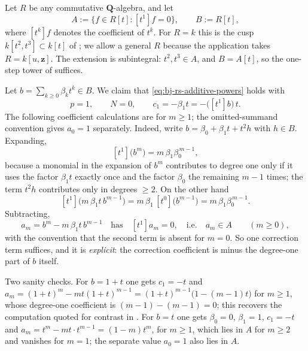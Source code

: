 \begin{example}[The cusp: $p=1$, with $c_1$ exhibited]
\label{ex:ch44-cusp-rs}
Let $R$ be any commutative $\mathbf Q$-algebra, and let
\[
 A:=\{f\in R[t]:[t^1]f=0\},
 \qquad
 B:=R[t],
\]
where $[t^k]f$ denotes the coefficient of $t^k$.  For $R=k$ this is
the cusp $k[t^2,t^3]\subset k[t]$ of ;
we allow a general $R$ because the application takes
$R=k[u,\mathbf z]$.  The extension is subintegral: $t^2,t^3\in A$, and
$B=A[t]$, so the one-step tower of  suffices.

Let $b=\sum_{k\ge0}\beta_kt^k\in B$.  We claim that
\eqref{eq:bj-rs-additive-powers} holds with
\[
 p=1,
 \qquad
 N=0,
 \qquad
 c_1=-\beta_1t=-\bigl([t^1]b\bigr)\,t.
\]
The following coefficient calculations are for $m\ge1$;
the omitted-summand convention gives $a_0=1$ separately.
Indeed, write $b=\beta_0+\beta_1t+t^2h$ with $h\in B$.  Expanding,
\[
 [t^1]\bigl(b^m\bigr)
 =m\,\beta_1\beta_0^{\,m-1},
\]
because a monomial in the expansion of $b^m$ contributes to degree one
only if it uses the factor $\beta_1t$ exactly once and the factor
$\beta_0$ the remaining $m-1$ times; the term $t^2h$ contributes only
in degrees $\ge2$.  On the other hand
\[
 [t^1]\bigl(m\,\beta_1t\,b^{m-1}\bigr)
 =m\,\beta_1\,[t^0]\bigl(b^{m-1}\bigr)
 =m\,\beta_1\beta_0^{\,m-1}.
\]
Subtracting,
\[
 a_m=b^m-m\,\beta_1t\,b^{m-1}
 \quad\text{has}\quad
 [t^1]a_m=0,
 \quad\text{i.e.}\quad
 a_m\in A
 \qquad(m\ge0),
\]
with the convention that the second term is absent for $m=0$.  So one
correction term suffices, and it is \emph{explicit}: the correction
coefficient is minus the degree-one part of $b$ itself.

Two sanity checks.  For $b=1+t$ one gets $c_1=-t$ and
$a_m=(1+t)^m-mt(1+t)^{m-1}=(1+t)^{m-1}\bigl(1-(m-1)t\bigr)$
for $m\ge1$, whose
degree-one coefficient is $(m-1)-(m-1)=0$; this recovers the computation
quoted for contrast in .  For
$b=t$ one gets $\beta_0=0$, $\beta_1=1$, $c_1=-t$ and
$a_m=t^m-mt\cdot t^{m-1}=(1-m)t^m$, for $m\ge1$, which lies in $A$ for $m\ge2$ and vanishes for
$m=1$; the separate value $a_0=1$ also lies in $A$.
\end{example}

